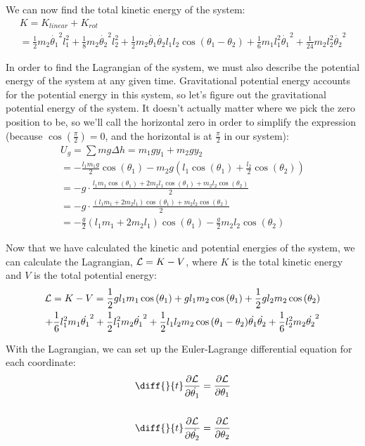 \documentclass[]{article}
\begin{document}
We can now find the total kinetic energy of the system:
\begin{gather*}
	K = K_{linear} + K_{rot} \\
	= \frac12m_2\dot{\theta_1}^2l_1^2 + \frac18m_2\dot{\theta_2}^2l_2^2 + \frac12m_2\dot{\theta_1}\dot{\theta_2}l_1l_2\cos(\theta_1 - \theta_2) + \frac16m_1l_1^2\dot{\theta_1}^2 + \frac{1}{24}m_2l_2^2\dot{\theta_2}^2
\end{gather*}

In order to find the Lagrangian of the system, we must also describe the potential energy of the system at any given time. Gravitational potential energy accounts for the potential energy in this system, so let's figure out the gravitational potential energy of the system. It doesn't actually matter where we pick the zero position to be, so we'll call the horizontal zero in order to simplify the expression (because $\cos(\frac{\pi}{2}) = 0$, and the horizontal is at $\frac{\pi}{2}$ in our system):
\begin{gather*}
	U_g = \sum mg\Delta h = m_1gy_1 + m_2gy_2 \\
	= -\frac{l_1m_1g}{2}\cos(\theta_1) - m_2g(l_1\cos(\theta_1) + \frac{l_2}{2}\cos(\theta_2)) \\
	= -g\cdot\frac{l_1m_1\cos(\theta_1) + 2m_2l_1\cos(\theta_1) + m_2l_2\cos(\theta_2)}{2} \\
	= -g\cdot\frac{(l_1m_1 + 2m_2l_1)\cos(\theta_1) + m_2l_2\cos(\theta_2)}{2} \\
	= -\frac{g}{2}(l_1m_1 + 2m_2l_1)\cos(\theta_1) - \frac{g}{2}m_2l_2\cos(\theta_2)
\end{gather*}

Now that we have calculated the kinetic and potential energies of the system, we can calculate the Lagrangian, $\mathcal{L} = K - V$, where $K$ is the total kinetic energy and $V$ is the total potential energy:
\begin{gather*}
	\mathcal{L} = K - V = \frac{1}{2}g l_1  m_1 \cos{ (\theta_1  )} + g l_1 m_2 \cos{ (\theta_1  )} + \frac{1}{2}g l_2  m_2 \cos{ (\theta_2  )} \\ + \frac{1}{6}l_1^2 m_1  \dot{\theta_1}^2 + \frac{1}{2}l_1^2 m_2  \dot{\theta_1}^2 + \frac{1}{2}l_1 l_2  m_2 \cos{ (\theta_1 - \theta_2  )} \dot{\theta_1} \dot{\theta_2} + \frac{1}{6}l_2^2 m_2  \dot{\theta_2}^2
\end{gather*}

With the Lagrangian, we can set up the Euler-Lagrange differential equation for each coordinate:
\begin{gather*}
	\diff{}{t}\frac{\partial \lagr}{\partial \dot{\theta_1}} = \frac{\partial \lagr}{\partial \theta_1} \\ \\
	\diff{}{t}\frac{\partial \lagr}{\partial \dot{\theta_2}} = \frac{\partial \lagr}{\partial \theta_2}
\end{gather*}
\end{document}
